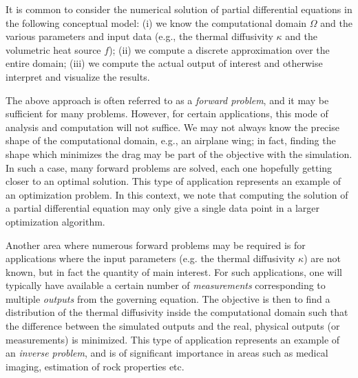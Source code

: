\documentclass[11pt]{article}
\begin{document}
It is common to consider the numerical solution of partial 
differential equations in the following conceptual model: 
(i) we know the computational domain $\Omega$
and the various parameters and input data 
(e.g., the thermal diffusivity $\kappa$ and the volumetric heat source $f$);
(ii) we compute a discrete approximation over the entire domain;
(iii) we compute the actual output of interest and otherwise
interpret and visualize the results.

The above approach is often referred to as a {\em forward problem},
and it may be sufficient for many problems. However, 
for certain applications, this mode of analysis and computation 
will not suffice.
We may not always know the precise shape of the computational 
domain, e.g., an airplane wing; in fact, finding the shape which 
minimizes the drag may be part of the objective with the simulation.
In such a case, many forward problems are solved, each one
hopefully getting closer to an optimal solution. This type of 
application represents an example of an optimization problem. 
In this context, we note that computing the solution of a 
partial differential equation may only give a single data 
point in a larger optimization algorithm.

Another area where numerous forward problems may be 
required is for applications where the input parameters
(e.g. the thermal diffusivity $\kappa$) are not known,
but in fact the quantity of main interest. For such applications,
one will typically have available a certain number of {\em measurements}
corresponding to multiple {\em outputs} from the governing equation.
The objective is then to find a distribution
of the thermal diffusivity inside the computational domain
such that the difference between the simulated outputs and 
the real, physical outputs (or measurements) is minimized. 
This type of application represents an example of an {\em inverse problem}, 
and is of significant importance in areas such as medical imaging,
estimation of rock properties etc.
\end{document}
